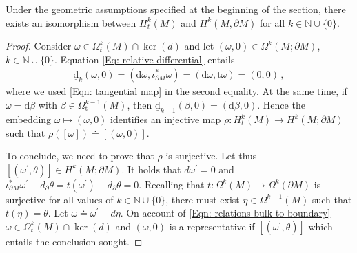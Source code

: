 \begin{proposition}\label{Prop: equivalence description of relative cohomology}
	Under the geometric assumptions specified at the beginning of the section, there exists an isomorphism between $H^k_t(M)$ and $H^k(M,\partial M)$ for all $k\in\mathbb{N}\cup\{0\}$.
\end{proposition}

\begin{proof}
	Consider $\omega\in\Omega^k_t(M)\cap\ker(d)$ and let $(\omega,0)\in\Omega^k(M;\partial M)$, $k\in\mathbb{N}\cup\{0\}$. Equation \eqref{Eq: relative-differential} entails
	\begin{align*}
	\underline{\mathrm{d}}_k(\omega,0)=(\mathrm{d}\omega,\iota^*_{\partial M}\omega)=(\mathrm{d}\omega,\mathrm{t}\omega)=(0,0)\,,
	\end{align*}
	where we used \eqref{Eqn: tangential map} in the second equality. At the same time, if $\omega=\mathrm{d}\beta$ with $\beta\in\Omega_\mathrm{t}^{k-1}(M)$, then $\underline{\mathrm{d}}_{k-1}(\beta,0)=(\mathrm{d}\beta,0)$.
	Hence the embedding $\omega\mapsto (\omega,0)$ identifies an injective map $\rho: H^k_t(M)\to  H^k(M;\partial M)$ such that $\rho([\omega])\doteq [(\omega,0)]$.
	
	To conclude, we need to prove that $\rho$ is surjective. Let thus $[(\omega^\prime,\theta)]\in H^k(M;\partial M)$. It holds that $d\omega^\prime=0$ and $\iota^*_{\partial M}\omega^\prime-d_\partial\theta=t(\omega^\prime)-d_\partial\theta=0$. Recalling that $t:\Omega^k(M)\to\Omega^k(\partial M)$ is surjective for all values of $k\in\mathbb{N}\cup\{0\}$, there must exist $\eta\in\Omega^{k-1}(M)$ such that $t(\eta)=\theta$. Let $\omega\doteq\omega^\prime -d\eta$. On account of \eqref{Eqn: relations-bulk-to-boundary} $\omega\in\Omega^k_t(M)\cap\ker(d)$ and $(\omega, 0)$ is a representative if $[(\omega^\prime,\theta)]$ which entails the conclusion sought.
\end{proof}

